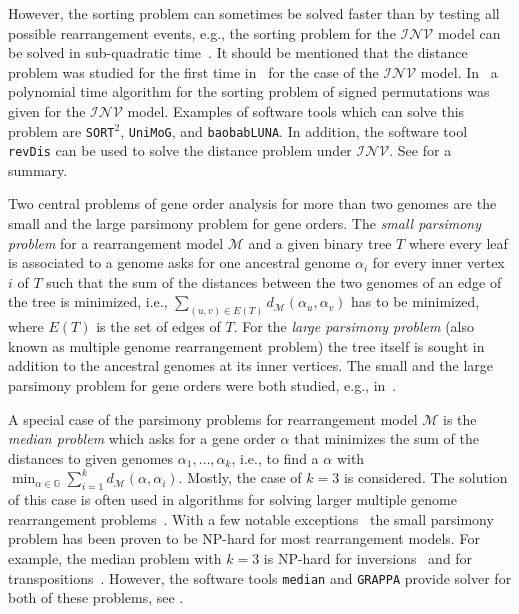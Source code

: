 \documentclass{svmult}
\newcommand{\m}[1]{\mathcal{#1}}
\begin{document}
However, the sorting problem can sometimes be solved faster than by testing all possible rearrangement events, e.g., the sorting problem 
for the $\m{INV}$ model can be solved in sub-quadratic time~\cite{Tannier_2004}. It should be mentioned that the distance problem 
was studied for the first time in~\cite{Sankoff_1992} for the case of the $\m{INV}$ model.
In~\cite{Hannenhalli_1999} a polynomial time algorithm for
the sorting problem of signed permutations was given for the $\m{INV}$ model.
Examples of software tools which can solve this problem are \texttt{SORT$^2$},
\texttt{UniMoG}, and \texttt{baobabLUNA}. In addition, the software tool
\texttt{revDis} can be used to solve the distance problem under $\m{INV}$.
See  for a summary.

Two central problems of gene order analysis for more than two genomes are the 
small and the large parsimony problem for gene orders. 
The \emph{small parsimony problem} for a rearrangement model $\m{M}$ and a given
binary tree $T$ where every leaf is associated to a genome asks for one ancestral genome $\alpha_{i}$ for every inner vertex $i$ of 
$T$ such that the sum of the distances between the two genomes of an edge of the
tree is minimized, i.e., $\sum_{(u,v)\in E(T)}d_{\m{M}}(\alpha_u,\alpha_v)$ has to be minimized, where $E(T)$ is the set of edges of $T$.
For the \emph{large parsimony problem} (also known as multiple genome rearrangement problem) the tree itself is sought in addition to the ancestral
genomes at its inner vertices. The small and the large parsimony problem for gene orders were both studied, e.g., 
in~\cite{Sankoff_1998}.

A special case of the parsimony problems for rearrangement model $\m{M}$ is the \emph{median problem} which asks for a gene order 
$\alpha$ that minimizes the sum of the distances to given genomes $\alpha_1,\ldots,\alpha_k$, i.e., to find a $\alpha$ 
with $\min_{\alpha \in \mathbb{G}} \sum_{i=1}^{k}d_{\m{M}}(\alpha,\alpha_i)$.
Mostly, the case of $k=3$ is considered. The solution of this case is often used in algorithms for solving larger multiple
genome rearrangement problems~\cite{Bourque_2002,Moret_2001,Zhang_2009}.
%
With a few notable exceptions~\cite{Feijao_2011,Ohlebusch_2007,Tannier_2009} the
small parsimony problem has been proven to be NP-hard for most rearrangement
models. For example, the median problem with $k=3$ is NP-hard for inversions~\cite{Caprara_1997} 
and for transpositions~\cite{Bader_2011}. However, the software tools
\texttt{median} and \texttt{GRAPPA} provide solver for both of these problems,
see .
\end{document}
